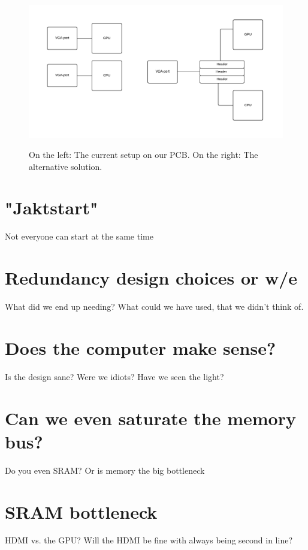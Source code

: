 \documentclass[../main/report.tex]{subfiles}
\begin{document}
\begin{figure}[H]
    \centering
    \includegraphics[width=\textwidth]{../discussion/assets/vga-solution.pdf}
    \label{fig:vga-solution}
    \caption{On the left: The current setup on our PCB. On the right: The alternative solution.}
\end{figure}





\section{"Jaktstart"}

Not everyone can start at the same time

\section{Redundancy design choices or w/e}
What did we end up needing?
What could we have used, that we didn't think of.

\section{Does the computer make sense?}
Is the design sane?
Were we idiots?
Have we seen the light?

\section{Can we even saturate the memory bus?}
Do you even SRAM?
Or is memory the big bottleneck

\section{SRAM bottleneck}
HDMI vs. the GPU?
Will the HDMI be fine with always being second in line?
\end{document}
